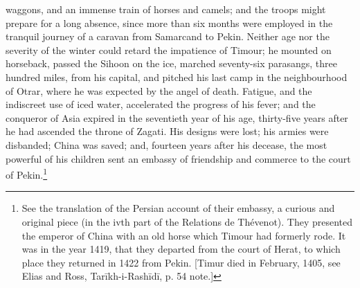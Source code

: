 waggons, and an immense train of horses and camels; and the troops might prepare for a long absence, since more than six months were employed in the tranquil journey of a caravan from Samarcand to Pekin. Neither age nor the severity of the winter could retard the impatience of Timour; he mounted on horseback, passed the Sihoon on the ice, marched seventy-six parasangs, three hundred miles, from his capital, and pitched his last camp in the neighbourhood of Otrar, where he was expected by the angel of death. Fatigue, and the indiscreet use of iced water, accelerated the progress of his fever; and the conqueror of Asia expired in the seventieth year of his age, thirty-five years after he had ascended the throne of Zagati. His designs were lost; his armies were disbanded; China was saved; and, fourteen years after his decease, the most powerful of his children sent an embassy of friendship and commerce to the court of Pekin.\footnote{See the translation of the Persian account of their embassy, a curious and original piece (in the ivth part of the Relations de Thévenot). They presented the emperor of China with an old horse which Timour had formerly rode. It was in the year 1419, that they departed from the court of Herat, to which place they returned in 1422 from Pekin. [Timur died in February, 1405, see Elias and Ross, Tarīkh-i-Rashīdī, p. 54 note.]}

